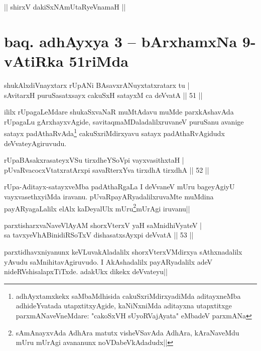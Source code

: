 \begin{center}%
|| shirxV dakiSxNAmUtaRyeVnamaH ||
\end{center}

\section*{baq. adhAyxya 3 -- bArxhamxNa 9-vAtiRka 51riMda}

\begin{shl}
shukAlxdiVnayxtarx rUpANi BAsavxrANuyxtatxratarx tu |\\
sAvitarxH puruSasatxsayx cakuSxH satayxM ca deVvatA \hfill || 51 ||
\end{shl}

\begin{artha}
ililx rUpagaLeMdare shukaSxvaNaR muMtAdavu muMde parxkAshavAda rUpagaLu gArxhayxvAgide, savitaqmaMDaladalilxruvaneV puruSanu avanige satayx padAthaRvAda\footnote[1]{adhAyxtamxkekx saMbaMdhisida cakuSxriMdirxyadiMda aditayxneMba adhideYvatada utapxtitxyAgide, kaNiNxniMda aditayxna utapxtitxge parxmANaveVneMdare: "cakoSxVH sUyoRVajAyata" eMbadeV parxmANa} cakuSxriMdirxyavu satayx padAthaRvAgidudx deVvateyAgiruvudu.
\end{artha}


\begin{shl}
rUpaBAsakxrasateyxVSu tirxdheYSoV\s pi vayxvasithxtaH |\\
pUvaRvacocxVtatxratArxpi savaRterxYva tirxdhA tirxdhA \hfill || 52 ||
\end{shl}

\begin{artha}
rUpa-Aditayx-satayxveMba padAthaRgaLa I deVvaneV mUru bageyAgiyU vayxvasethxyiMda iravanu. pUvaRpayARyadalilxruvaMte muMdina payARyagaLalilx elAlx kaDeyalUlx mUru\footnote[2]{sAmAnayxvAda AdhAra matutx visheVSavAda AdhAra, kAraNaveMdu mUru mUrAgi avananunx noVDabeVkAdadudx||}mUrAgi iruvanu||
\end{artha}


\begin{shl}
parxtisharxvaNaveVlAyAM shorxVterxV yaH saMnidhiVyateV |\\
sa tavxyeVhABinidiRSoTxV dishasatxsAyxpi deVvatA \hfill || 53 ||
\end{shl}

\begin{artha}
parxtidhavxniyanunx keVLuvakAladalilx shorxVterxVMdirxya sAthxnadalilx yAvudu saMnihitavAgiruvudo. I AkAshadalilx payARyadalilx adeV nideRVshisalapxTiTxde. adakUkx dikekx deVvateyu||
\end{artha}

